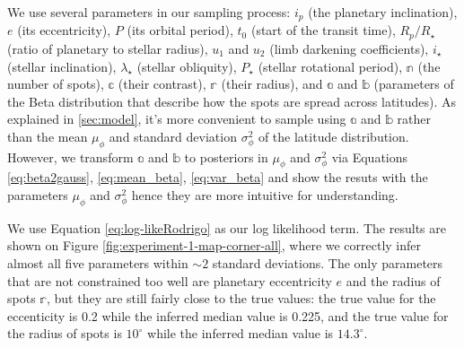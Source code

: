 \documentclass[twocolumn]{aastex631}
\begin{document}
We use several parameters in our sampling process: $i_p$ (the planetary inclination), $e$ (its eccentricity), $P$ (its orbital period),
$t_0$ (start of the transit time), $R_p/R_\star$ (ratio of planetary to stellar radius), $u_1$ and $u_2$ (limb darkening coefficients),
$i_\star$ (stellar inclination), $\lambda_\star$ (stellar obliquity), $P_\star$ (stellar rotational period), $\mathbb{n}$ (the number of spots), 
$\mathbb{c}$ (their contrast), $\mathbb{r}$ (their radius), and $\mathbb{a}$ and $\mathbb{b}$ (parameters of the Beta distribution that describe 
how the spots are spread across latitudes). As explained in \ref{sec:model}, it's more convenient to sample using $\mathbb{a}$ and $\mathbb{b}$ 
rather than the mean $\mu_\phi$  and standard deviation $\sigma^2_\phi$ of the latitude distribution. 
However, we transform $\mathbb{a}$ and $\mathbb{b}$ to posteriors in $\mu_\phi$  and $\sigma^2_\phi$ via Equations \ref{eq:beta2gauss}, 
\ref{eq:mean_beta}, \ref{eq:var_beta} and show the resuts with the parameters $\mu_\phi$ and $\sigma^2_\phi$ hence they are more intuitive for understanding. 

We use Equation \ref{eq:log-likeRodrigo} as our log likelihood term. The results are shown on Figure \ref{fig:experiment-1-map-corner-all},
where we correctly infer almost all five parameters within $\sim 2$ standard deviations. The only parameters that are not constrained too well are 
planetary eccentricity $e$ and the radius of spots $\mathbb{r}$, but they are still fairly close to the true values: the true value for the
eccenticity is 0.2 while the inferred median value is 0.225, and the true value for the radius of spots is $10^\circ$ while the inferred median value is
$14.3^\circ$. 
\end{document}
